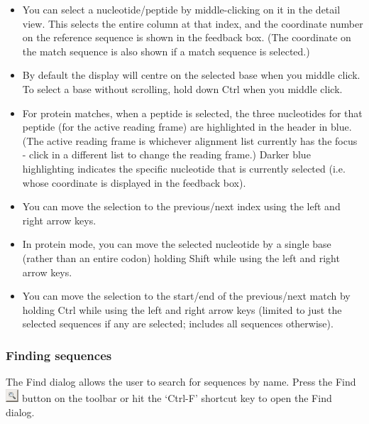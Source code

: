 \documentclass[letterpaper]{article}
\newcommand\liststyleWWviiiNumxiii{%
\renewcommand\labelitemi{{\textbullet}}
\renewcommand\labelitemii{o}
\renewcommand\labelitemiii{[F0A7?]}
\renewcommand\labelitemiv{[F0B7?]}
}
\begin{document}
\liststyleWWviiiNumxiii
\begin{itemize}
\item {
You can select a nucleotide/peptide by middle-clicking on it in the
detail view. This selects the entire column at that index, and the
coordinate number on the reference sequence is shown in the feedback
box. (The coordinate on the match sequence is also shown if a match
sequence is selected.)}
\item {
By default the display will centre on the selected base when you middle
click. To select a base without scrolling, hold down Ctrl when you
middle click.}
\item {
For protein matches, when a peptide is selected, the three nucleotides
for that peptide (for the active reading frame) are highlighted in the
header in blue. (The active reading frame is whichever alignment list
currently has the focus - click in a different list to change the
reading frame.) Darker blue highlighting indicates the specific
nucleotide that is currently selected (i.e. whose coordinate is
displayed in the feedback box).}
\item {
You can move the selection to the previous/next index using the left and
right arrow keys.}
\item {
In protein mode, you can move the selected nucleotide by a single base
(rather than an entire codon) holding Shift while using the left and
right arrow keys.}
\item {
You can move the selection to the start/end of the previous/next match
by holding Ctrl while using the left and right arrow keys (limited to
just the selected sequences if any are selected; includes all sequences
otherwise).}
\end{itemize}

{\color[rgb]{0.30980393,0.5058824,0.7411765}\subsubsection[Finding sequences]{Finding sequences}}
\hypertarget{RefHeading1961056909880}{}{
The Find dialog allows the user to search for sequences by name. Press
the Find 
\includegraphics[width=0.487cm,height=0.487cm]{img_button_find.png} 
button on the toolbar or hit the
{\textquoteleft}Ctrl-F{\textquoteright} shortcut key to open the Find
dialog.}
\end{document}
